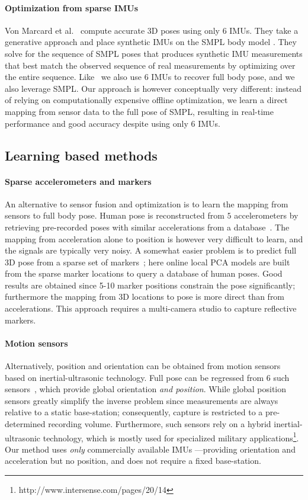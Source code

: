 \documentclass[acmtog]{acmart}
\begin{document}
\paragraph{Optimization from sparse IMUs} Von Marcard et al.~ compute accurate 3D poses using only 6 IMUs. They take a generative approach and place synthetic IMUs on the SMPL body model \cite{loper2015smpl}. They solve for the sequence of SMPL poses that produces synthetic IMU measurements that best match the observed sequence of real measurements by optimizing over the entire sequence. Like~\cite{von2017sparse} we also use 6 IMUs to recover full body pose, and we also leverage SMPL. Our approach is however conceptually very different: instead of relying on computationally expensive offline optimization, we learn a direct mapping from sensor data to the full pose of SMPL, resulting in real-time performance and good accuracy despite using only 6 IMUs. 

\subsection{Learning based methods}\paragraph{Sparse accelerometers and markers} An alternative to sensor fusion and optimization is to learn the mapping from sensors to full body pose. Human pose is reconstructed from $5$ accelerometers by retrieving pre-recorded poses with similar accelerations from a database~\cite{Slyper2008,tautges2011motion}. The mapping from acceleration alone to position is however very difficult to learn, and the signals are typically very noisy. A somewhat easier problem is to predict full 3D pose from a sparse set of markers~\cite{chai2005performance}; here online local PCA models are built from the sparse marker 
locations to query a database of human poses. 
Good results are obtained since 5-10 marker positions constrain the pose significantly; furthermore the mapping from 3D locations to pose is more direct than from accelerations. This approach requires a multi-camera studio to capture reflective markers.

\paragraph{Motion sensors} Alternatively, position and orientation can be obtained from motion sensors based on inertial-ultrasonic technology. Full pose can be regressed from $6$ such sensors~\cite{liu2011realtime}, which provide global orientation \emph{and position}. While global position sensors greatly simplify the inverse problem since measurements are always relative to a static base-station; consequently, capture is restricted to a pre-determined recording volume. Furthermore, such sensors rely on a hybrid inertial-ultrasonic technology, which is mostly used for specialized military applications\footnote{http://www.intersense.com/pages/20/14}.
Our method uses \emph{only} commercially available IMUs ---providing orientation and acceleration but no position, and does not require a fixed base-station. 
\end{document}
